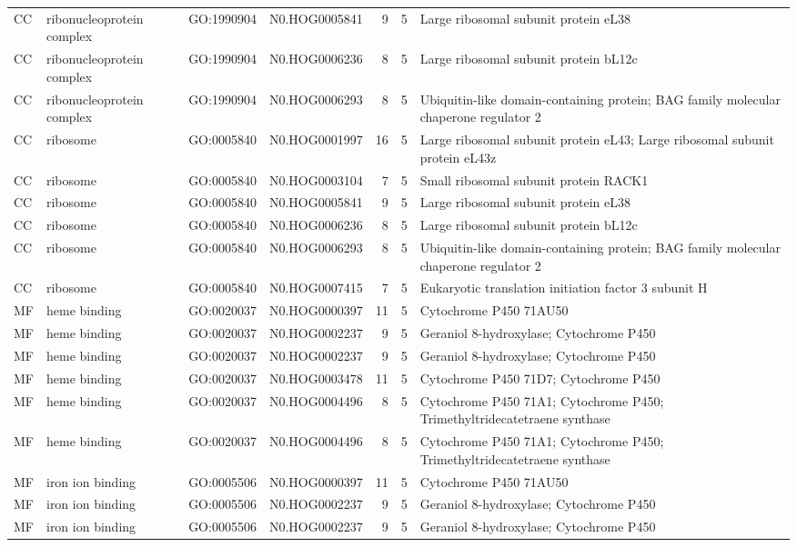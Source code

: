 \begin{table}
\begin{tabular}[t]{llllrrl}
CC & ribonucleoprotein complex & GO:1990904 & N0.HOG0005841 & 9 & 5 & Large ribosomal subunit protein eL38\\
CC & ribonucleoprotein complex & GO:1990904 & N0.HOG0006236 & 8 & 5 & Large ribosomal subunit protein bL12c\\
CC & ribonucleoprotein complex & GO:1990904 & N0.HOG0006293 & 8 & 5 & Ubiquitin-like domain-containing protein; BAG family molecular chaperone regulator 2\\
CC & ribosome & GO:0005840 & N0.HOG0001997 & 16 & 5 & Large ribosomal subunit protein eL43; Large ribosomal subunit protein eL43z\\
CC & ribosome & GO:0005840 & N0.HOG0003104 & 7 & 5 & Small ribosomal subunit protein RACK1\\
CC & ribosome & GO:0005840 & N0.HOG0005841 & 9 & 5 & Large ribosomal subunit protein eL38\\
CC & ribosome & GO:0005840 & N0.HOG0006236 & 8 & 5 & Large ribosomal subunit protein bL12c\\
CC & ribosome & GO:0005840 & N0.HOG0006293 & 8 & 5 & Ubiquitin-like domain-containing protein; BAG family molecular chaperone regulator 2\\
CC & ribosome & GO:0005840 & N0.HOG0007415 & 7 & 5 & Eukaryotic translation initiation factor 3 subunit H\\
MF & heme binding & GO:0020037 & N0.HOG0000397 & 11 & 5 & Cytochrome P450 71AU50\\
MF & heme binding & GO:0020037 & N0.HOG0002237 & 9 & 5 & Geraniol 8-hydroxylase; Cytochrome P450\\
MF & heme binding & GO:0020037 & N0.HOG0002237 & 9 & 5 & Geraniol 8-hydroxylase; Cytochrome P450\\
MF & heme binding & GO:0020037 & N0.HOG0003478 & 11 & 5 & Cytochrome P450 71D7; Cytochrome P450\\
MF & heme binding & GO:0020037 & N0.HOG0004496 & 8 & 5 & Cytochrome P450 71A1; Cytochrome P450; Trimethyltridecatetraene synthase\\
MF & heme binding & GO:0020037 & N0.HOG0004496 & 8 & 5 & Cytochrome P450 71A1; Cytochrome P450; Trimethyltridecatetraene synthase\\
MF & iron ion binding & GO:0005506 & N0.HOG0000397 & 11 & 5 & Cytochrome P450 71AU50\\
MF & iron ion binding & GO:0005506 & N0.HOG0002237 & 9 & 5 & Geraniol 8-hydroxylase; Cytochrome P450\\
MF & iron ion binding & GO:0005506 & N0.HOG0002237 & 9 & 5 & Geraniol 8-hydroxylase; Cytochrome P450\\

\end{tabular}
\end{table}
